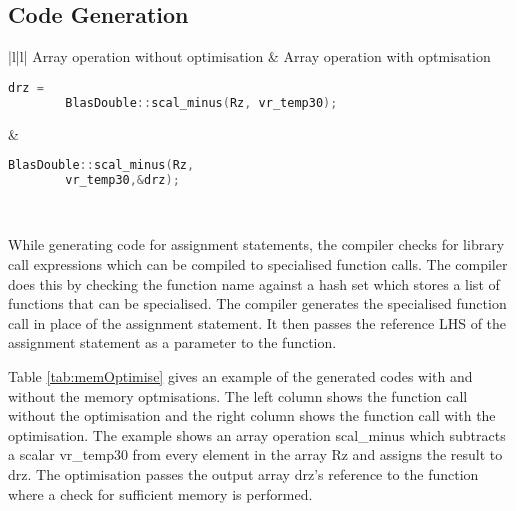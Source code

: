 \subsection{Code Generation}

\begin{table}
  \begin{tabular}{|l|l|}
  \hline
  Array operation without optimisation & 
Array operation with optmisation 
   \\
  \hhline{|=|=|}
  
  {
  \begin{lstlisting}[language=c,frame=none, numbers=none]
	drz = 
		BlasDouble::scal_minus(Rz, vr_temp30);
  \end{lstlisting}
  } &
   {
   \begin{lstlisting}[language=c,frame=none, numbers=none]
	 BlasDouble::scal_minus(Rz, 
		vr_temp30,&drz);
   \end{lstlisting}
   } \\
   \hline
   \end{tabular}
   \caption[Generated code with and without memory optimisations]{Table shows the generated code with and without memory optimisations}
   \label{tab:memOptimise}
   \end{table}
While generating code for assignment statements, the compiler checks for library call expressions which can be compiled to specialised function calls. The compiler does this by checking the function name against a hash set which stores a list of functions that can be specialised. The compiler generates the specialised function call in place of the assignment statement. It then passes the reference LHS of the assignment statement as a parameter to the function. 

Table \ref{tab:memOptimise} gives an example of the generated codes with and without the memory optmisations. The left column shows the function call without the optimisation and the right column shows the function call with the optimisation. The example shows an array operation scal\_minus which subtracts a scalar vr\_temp30 from every element in the array Rz and assigns the result to drz. The optimisation passes the output array drz's reference to the function where a check for sufficient memory is performed.
